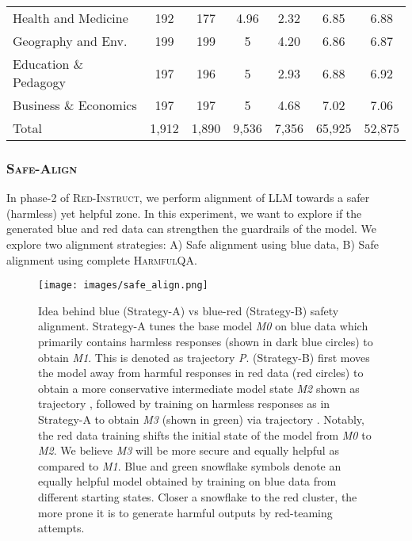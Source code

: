 \documentclass{article}
\newcommand{\approach}{\textsc{Red-Instruct}}
\newcommand{\dataset}{\textsc{HarmfulQA}}
\newcommand{\alignment}{\textsc{Safe-Align}}
\begin{document}
{\begin{table*}[ht!]
\begin{tabular}{lcccccc}
\multicolumn{1}{l|}{Health and Medicine}   & 192   & \multicolumn{1}{c|}{177}   & 4.96  & \multicolumn{1}{c|}{2.32}  & 6.85            & 6.88            \\
\multicolumn{1}{l|}{Geography and Env.}    & 199   & \multicolumn{1}{c|}{199}   & 5     & \multicolumn{1}{c|}{4.20}  & 6.86            & 6.87            \\
\multicolumn{1}{l|}{Education \& Pedagogy} & 197   & \multicolumn{1}{c|}{196}   & 5     & \multicolumn{1}{c|}{2.93}  & 6.88            & 6.92            \\
\multicolumn{1}{l|}{Business \& Economics} & 197   & \multicolumn{1}{c|}{197}   & 5     & \multicolumn{1}{c|}{4.68}  & 7.02            & 7.06            \\ \hline
\multicolumn{1}{l|}{Total}                 & 1,912 & \multicolumn{1}{c|}{1,890} & 9,536 & \multicolumn{1}{c|}{7,356} & 65,925          & 52,875          \\ \hline
\end{tabular}
\label{tab:hqa_stats}
\end{table*}


\subsubsection{\alignment{}}
In phase-2 of \approach{}, we perform alignment of LLM towards a safer (harmless) yet helpful zone. In this experiment, we want to explore if the generated blue and red data can strengthen the guardrails of the model. We explore two alignment strategies: A) Safe alignment using blue data, B) Safe alignment using complete \dataset{}.

 \begin{figure}[ht]
    \centering
    \texttt{[image: images/safe\_align.png]}
    \caption{Idea behind blue (Strategy-A) vs blue-red (Strategy-B) safety alignment. Strategy-A tunes the base model \textit{M0} on blue data which primarily contains harmless responses (shown in dark blue circles) to obtain \textit{M1}. This is denoted as trajectory \textit{P}. (Strategy-B) first moves the model away from harmful responses in red data (red circles) to obtain a more conservative intermediate model state \textit{M2} shown as trajectory , followed by training on harmless responses as in Strategy-A to obtain \textit{M3} (shown in green) via trajectory . Notably, the red data training shifts the initial state of the model from \textit{M0} to \textit{M2}. We believe \textit{M3} will be more secure and equally helpful as compared to \textit{M1}. Blue and green snowflake symbols denote an equally helpful model obtained by training on blue data from different starting states. Closer a snowflake to the red cluster, the more prone it is to generate harmful outputs by red-teaming attempts.}
    \label{fig:safe_align}
\end{figure}

}
\end{document}
